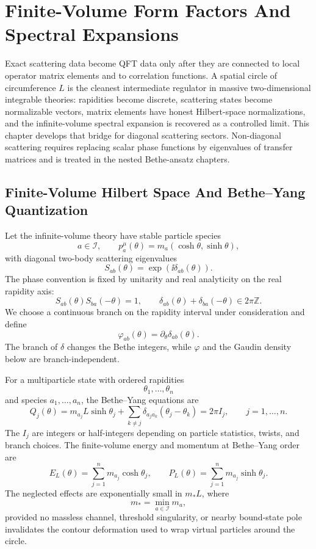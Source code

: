 \chapter{Finite-Volume Form Factors And Spectral Expansions}
\label{ch:integrable-finite-volume-form-factors}

\ConventionsLorentzian

Exact scattering data become QFT data only after they are connected to local
operator matrix elements and to correlation functions.  A spatial circle of
circumference \(L\) is the cleanest intermediate regulator in massive
two-dimensional integrable theories: rapidities become discrete, scattering
states become normalizable vectors, matrix elements have honest Hilbert-space
normalizations, and the infinite-volume spectral expansion is recovered as a
controlled limit.  This chapter develops that bridge for diagonal scattering
sectors.  Non-diagonal scattering requires replacing scalar phase functions by
eigenvalues of transfer matrices and is treated in the nested Bethe-ansatz
chapters.

\section{Finite-Volume Hilbert Space And Bethe--Yang Quantization}

Let the infinite-volume theory have stable particle species
\[
  a\in\mathcal I,
  \qquad
  p_a^\mu(\theta)=m_a(\cosh\theta,\sinh\theta),
\]
with diagonal two-body scattering eigenvalues
\[
  S_{ab}(\theta)=\exp(\ii\delta_{ab}(\theta)).
\]
The phase convention is fixed by unitarity and real analyticity on the real
rapidity axis:
\[
  S_{ab}(\theta)S_{ba}(-\theta)=1,
  \qquad
  \delta_{ab}(\theta)+\delta_{ba}(-\theta)\in2\pi\mathbb Z .
\]
We choose a continuous branch on the rapidity interval under consideration
and define
\[
  \varphi_{ab}(\theta)=\partial_\theta\delta_{ab}(\theta).
\]
The branch of \(\delta\) changes the Bethe integers, while
\(\varphi\) and the Gaudin density below are branch-independent.

For a multiparticle state with ordered rapidities
\[
  \theta_1,\ldots,\theta_n
\]
and species \(a_1,\ldots,a_n\), the Bethe--Yang equations are
\begin{equation}
  Q_j(\theta)
  =
  m_{a_j}L\sinh\theta_j
  +
  \sum_{k\ne j}
  \delta_{a_ja_k}(\theta_j-\theta_k)
  =
  2\pi I_j,
  \qquad j=1,\ldots,n .
  \label{eq:finite-volume-bethe-yang}
\end{equation}
The \(I_j\) are integers or half-integers depending on particle statistics,
twists, and branch choices.  The finite-volume energy and momentum at
Bethe--Yang order are
\[
  E_L(\theta)=\sum_{j=1}^n m_{a_j}\cosh\theta_j,
  \qquad
  P_L(\theta)=\sum_{j=1}^n m_{a_j}\sinh\theta_j .
\]
The neglected effects are exponentially small in \(m_\ast L\), where
\[
  m_\ast=\min_{a\in\mathcal I}m_a,
\]
provided no massless channel, threshold singularity, or nearby bound-state
pole invalidates the contour deformation used to wrap virtual particles
around the circle.

